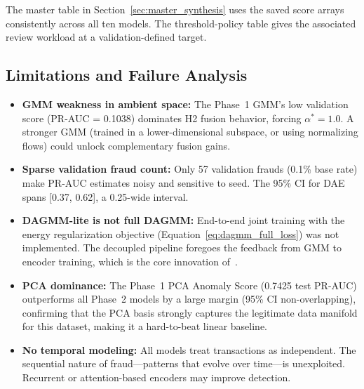 The master table in Section~\ref{sec:master_synthesis} uses the saved score arrays consistently across all ten models. The threshold-policy table gives the associated review workload at a validation-defined target.

\subsection{Limitations and Failure Analysis}
\label{sec:abl_limitations}

\begin{itemize}
    \item \textbf{GMM weakness in ambient space:} The Phase~1 GMM's low validation score (PR-AUC = 0.1038) dominates H2 fusion behavior, forcing $\alpha^* = 1.0$. A stronger GMM (trained in a lower-dimensional subspace, or using normalizing flows) could unlock complementary fusion gains.
    \item \textbf{Sparse validation fraud count:} Only 57 validation frauds (0.1\% base rate) make PR-AUC estimates noisy and sensitive to seed. The 95\% CI for DAE spans [0.37, 0.62], a 0.25-wide interval.
    \item \textbf{DAGMM-lite is not full DAGMM:} End-to-end joint training with the energy regularization objective (Equation~\ref{eq:dagmm_full_loss}) was not implemented. The decoupled pipeline foregoes the feedback from GMM to encoder training, which is the core innovation of~\cite{zong2018deep}.
    \item \textbf{PCA dominance:} The Phase~1 PCA Anomaly Score (0.7425 test PR-AUC) outperforms all Phase~2 models by a large margin (95\% CI non-overlapping), confirming that the PCA basis strongly captures the legitimate data manifold for this dataset, making it a hard-to-beat linear baseline.
    \item \textbf{No temporal modeling:} All models treat transactions as independent. The sequential nature of fraud---patterns that evolve over time---is unexploited. Recurrent or attention-based encoders may improve detection.
\end{itemize}
